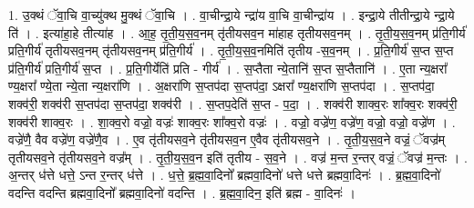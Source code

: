 \documentclass[17pt]{extarticle}
\begin{document}
1. उ॒क्थं ॅवा॒चि वा॒च्यु॑क्थ मु॒क्थं ॅवा॒चि । . वा॒चीन्द्रा॒ये न्द्रा॑य वा॒चि वा॒चीन्द्रा॑य । . इन्द्रा॒ये तीतीन्द्रा॒ये न्द्रा॒ये ति॑ । . इत्या॑हा॒हे तीत्या॑ह । . आ॒ह॒ तृ॒ती॒य॒स॒व॒नम् तृ॑तीयसव॒न मा॑हाह तृतीयसव॒नम् । . तृ॒ती॒य॒स॒व॒नम् प्र॑ति॒गीर्य॑ प्रति॒गीर्य॑ तृतीयसव॒नम् तृ॑तीयसव॒नम् प्र॑ति॒गीर्य॑ । . तृ॒ती॒य॒स॒व॒नमिति॑ तृतीय -स॒व॒नम् । . प्र॒ति॒गीर्य॑ स॒प्त स॒प्त प्र॑ति॒गीर्य॑ प्रति॒गीर्य॑ स॒प्त । . प्र॒ति॒गीर्येति॑ प्रति - गीर्य॑ । . स॒प्तैता न्ये॒तानि॑ स॒प्त स॒प्तैतानि॑ । . ए॒ता न्य॒क्षरा᳚ ण्य॒क्षरा᳚ ण्ये॒ता न्ये॒ता न्य॒क्षरा॑णि । . अ॒क्षरा॑णि स॒प्तप॑दा स॒प्तप॑दा॒ ऽक्षरा᳚ ण्य॒क्षरा॑णि स॒प्तप॑दा । . स॒प्तप॑दा॒ शक्व॑री॒ शक्व॑री स॒प्तप॑दा स॒प्तप॑दा॒ शक्व॑री । . स॒प्तप॒देति॑ स॒प्त - प॒दा॒ । . शक्व॑री शाक्व॒रः शा᳚क्व॒रः शक्व॑री॒ शक्व॑री शाक्व॒रः । . शा॒क्व॒रो वज्रो॒ वज्रः॑ शाक्व॒रः शा᳚क्व॒रो वज्रः॑ । . वज्रो॒ वज्रे॑ण॒ वज्रे॑ण॒ वज्रो॒ वज्रो॒ वज्रे॑ण । . वज्रे॑णै॒ वैव वज्रे॑ण॒ वज्रे॑णै॒व । . ए॒व तृ॑तीयसव॒ने तृ॑तीयसव॒न ए॒वैव तृ॑तीयसव॒ने । . तृ॒ती॒य॒स॒व॒ने वज्रं॒ ॅवज्र॑म् तृतीयसव॒ने तृ॑तीयसव॒ने वज्र᳚म् । . तृ॒ती॒य॒स॒व॒न इति॑ तृतीय - स॒व॒ने । . वज्र॑ म॒न्त र॒न्तर् वज्रं॒ ॅवज्र॑ म॒न्तः । . अ॒न्तर् ध॑त्ते धत्ते॒ ऽन्त र॒न्तर् ध॑त्ते । . ध॒त्ते॒ ब्र॒ह्म॒वा॒दिनो᳚ ब्रह्मवा॒दिनो॑ धत्ते धत्ते ब्रह्मवा॒दिनः॑ । . ब्र॒ह्म॒वा॒दिनो॑ वदन्ति वदन्ति ब्रह्मवा॒दिनो᳚ ब्रह्मवा॒दिनो॑ वदन्ति । . ब्र॒ह्म॒वा॒दिन॒ इति॑ ब्रह्म - वा॒दिनः॑ । \newline
\end{document}
